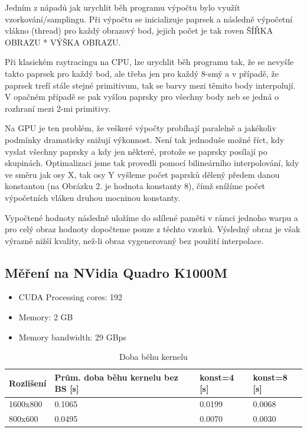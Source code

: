 \documentclass[12pt,a4paper,titlepage,final]{report}
\begin{document}
	\vspace{5mm}
Jedním z nápadů jak urychlit běh programu výpočtu bylo využít vzorkování/samplingu. Při výpočtu se inicializuje paprsek a následně výpočetní vlákno (thread) pro každý obrazový bod, jejich počet je tak roven ŠÍŘKA OBRAZU * VÝŠKA OBRAZU. 
	
	Při klasickém raytracingu na CPU, lze urychlit běh programu tak, že se nevyšle takto paprsek pro každý bod, ale třeba jen pro každý 8-smý a v případě, že paprsek trefí stále stejné primitivum, tak se barvy mezi těmito body interpolují. V opačném případě se pak vyšlou paprsky pro všechny body neb se jedná o rozhraní mezi 2-mi primitivy.
	
	Na GPU je ten problém, že veškeré výpočty probíhají paralelně a jakékoliv podmínky dramaticky snižují výkonnost. Není tak jednoduše možné říct, kdy vyslat všechny paprsky a kdy jen některé, protože se paprsky posílají po skupinách. Optimalizaci jsme tak provedli pomocí bilineárního interpolování, kdy ve směru jak osy X, tak osy Y vyšleme počet paprsků dělený předem danou konstantou (na Obrázku 2. je hodnota konstanty 8), čímž snížíme počet výpočetních vláken druhou mocninou konstanty.
	
	Vypočtené hodnoty následně uložíme do sdílené paměti v rámci jednoho warpu a pro celý obraz hodnoty dopočteme pouze z těchto vzorků. Výsledný obraz je však výrazně nižší kvality, než-li obraz vygenerovaný bez použití interpolace.


\subsection{Měření na NVidia Quadro K1000M}
\begin{itemize}
	\item CUDA Processing cores: 192
	\item Memory: 2 GB
	\item Memory bandwidth: 29 GBps 
\end{itemize}	
	
\begin{table}[h!]
	\begin{center}
    \begin{tabular}{ | p{3.5cm} | p{3.5cm} | p{3.5cm} | p{3.5cm} |}
    \hline
    Rozlišení & Prům. doba běhu kernelu bez BS [s]& konst=4 [s]& konst=8 [s]
    \\ \hline
    
	1600x800 & 0.1065 & 0.0199 & 0.0068
	\\ \hline
	
	800x600 & 0.0495 & 0.0070 & 0.0030
	\\ \hline
	
    \end{tabular}
	\end{center}	
	\caption{Doba běhu kernelu}  
\end{table}
\end{document}

